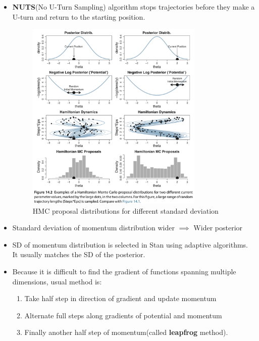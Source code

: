 \documentclass[a4paper]{article}
\begin{document}
\begin{itemize}
    \item \textbf{NUTS}(No U-Turn Sampling) algorithm stops trajectories before they make a U-turn and return to the starting position. 
    \begin{figure}[H]
        \centering
        \includegraphics[width=0.8\textwidth]{sd_proposal_distributions}
        \caption{HMC proposal distributions for different standard deviation}
        \label{fig:sd_proposal_distributions}
    \end{figure}
    \item Standard deviation of momentum distribution wider $\implies$ Wider posterior
    \item SD of momentum distribution is selected in Stan using adaptive algorithms. It usually matches the SD of the posterior.
    \item Because it is difficult to find the gradient of functions spanning multiple dimensions, usual method is:
        \begin{enumerate}
            \item Take half step in direction of gradient and update momentum
            \item Alternate full steps along gradients of potential and momentum
            \item Finally another half step of momentum(called \textbf{leapfrog} method). 
        \end{enumerate}

\end{itemize}
\end{document}

